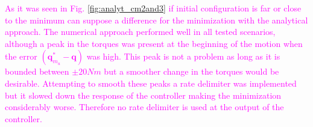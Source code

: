 \textcolor{magenta}{As it was seen in Fig.	\ref{fig:analyt_cm2and3} if initial configuration is far or close to the minimum can suppose a difference for the minimization with the analytical approach. The numerical approach performed well in all tested scenarios, although a peak in the torques was present at the beginning of the motion when the error $(\mathbf{q}_{m_u}^\ast - \mathbf{q})$ was high. This peak is not a problem as long as it is bounded between $\pm 20 Nm$ but a smoother change in the torques would be desirable. Attempting to smooth these peaks a rate delimiter was implemented but it slowed down the response of the controller making the minimization considerably worse. Therefore no rate delimiter is used at the output of the controller.
}

